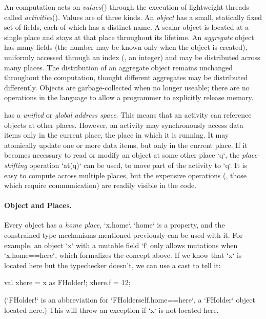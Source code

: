 An \Xten{} computation acts on \emph{values}() through
the execution of lightweight threads called
\emph{activities}(). Values are of three kinds.  
An {\em object}
 has a small, statically fixed set of fields, each of
which has a distinct name. A scalar object is located at a single place and
stays at that place throughout its lifetime. An \emph{aggregate} object has
many fields (the number may be known only when the object is created),
uniformly accessed through an index (\eg, an integer) and may be distributed
across many places. The distribution of an aggregate object remains unchanged
throughout the computation, thought different aggregates may be distributed
differently. Objects are garbage-collected when no longer useable; there are
no operations in the language to allow a programmer to explicitly release
memory.

{}\Xten{} has a \emph{unified} or \emph{global address space}. This means that
an activity can reference objects at other places. However, an activity may
synchronously access data items only in the current place, the place in which
it is running. It may atomically update one or more data items, but only in
the current place.   If it becomes necessary to read or modify an object at
some other place \xcd`q`, the {\em place-shifting} operation \xcd`at(q)` can
be used, to move part of the activity to \xcd`q`.   It is easy to compute
across multiple places, but the expensive operations (\eg, those which require
communication) are readily visible in the code. 

\paragraph{Object and Places.}

Every object has a {\em home place}, \xcd`x.home`.  \xcd`home` is a property,
and the constrained type mechanisms mentioned previously can be used with it.
For example, an object \xcd`x` with a mutable field \xcd`f` only allows
mutations when \xcd`x.home==here`, which formalizes the concept above.  If we
know that \xcd`x` is located here but the typechecker doesn't, we can use a
cast to tell it:
\begin{xten}
val xhere = x as FHolder!;
xhere.f = 12;
\end{xten}
(\xcd`FHolder!` is an abbreviation for \xcd`FHolder{self.home==here}`, a
\xcd`FHolder` object located here.)
This will throw an exception if \xcd`x` is not located here.

